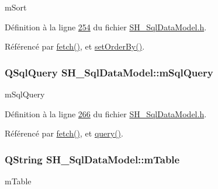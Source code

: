m\-Sort 



Définition à la ligne \hyperlink{SH__SqlDataModel_8h_source_l00254}{254} du fichier \hyperlink{SH__SqlDataModel_8h_source}{S\-H\-\_\-\-Sql\-Data\-Model.\-h}.



Référencé par \hyperlink{classSH__SqlDataModel_a8d9b08d282a304945b9ee2f474020980}{fetch()}, et \hyperlink{classSH__SqlDataModel_a34cae2fefa659a4bfefbfb3a6328e832}{set\-Order\-By()}.

\hypertarget{classSH__SqlDataModel_a54f0cf057e3200f6b199508958e43fec}{
\subsubsection[{m\-Sql\-Query}]{\setlength{\rightskip}{0pt plus 5cm}Q\-Sql\-Query S\-H\-\_\-\-Sql\-Data\-Model\-::m\-Sql\-Query\hspace{0.3cm}{\ttfamily [private]}}}\label{classSH__SqlDataModel_a54f0cf057e3200f6b199508958e43fec}


m\-Sql\-Query 



Définition à la ligne \hyperlink{SH__SqlDataModel_8h_source_l00266}{266} du fichier \hyperlink{SH__SqlDataModel_8h_source}{S\-H\-\_\-\-Sql\-Data\-Model.\-h}.



Référencé par \hyperlink{classSH__SqlDataModel_a8d9b08d282a304945b9ee2f474020980}{fetch()}, et \hyperlink{classSH__SqlDataModel_acca7800c1da13145fd5386f287c15da3}{query()}.

\hypertarget{classSH__SqlDataModel_a88b8738a0d2803c94295c90c83d65f32}{
\subsubsection[{m\-Table}]{\setlength{\rightskip}{0pt plus 5cm}Q\-String S\-H\-\_\-\-Sql\-Data\-Model\-::m\-Table\hspace{0.3cm}{\ttfamily [private]}}}\label{classSH__SqlDataModel_a88b8738a0d2803c94295c90c83d65f32}


m\-Table 



